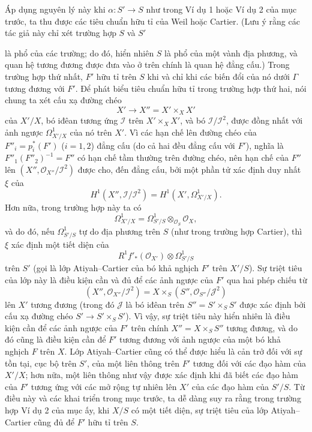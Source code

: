 Áp dụng nguyên lý này khi $\alpha:S'\longrightarrow S$ như trong Ví dụ 1 hoặc
Ví dụ 2 của mục trước, ta thu được các tiêu chuẩn hữu tỉ của Weil hoặc Cartier.
(Lưu ý rằng các tác giả này chỉ xét trường hợp $S$ và $S'$

là phổ của các trường; do đó, hiển nhiên $S$ là phổ của một vành địa phương,
và quan hệ tương đương được đưa vào ở trên chính là quan hệ đẳng cấu.) Trong
trường hợp thứ nhất, $F'$ hữu tỉ trên $S$ khi và chỉ khi các biến đổi của nó
dưới $\Gamma$ tương đương với $F'$. Để phát biểu tiêu chuẩn hữu tỉ trong trường
hợp thứ hai, nói chung ta xét cấu xạ đường chéo
\[
  X'\longrightarrow X''=X'\times_XX'
\]
của $X'/X$, bó iđêan tương ứng $\mathcal I$ trên $X'\times_XX'$, và bó
$\mathcal I/\mathcal I^2$, được đồng nhất với ảnh ngược
$\Omega^1_{X'/X}$ của nó trên $X'$. Vì các hạn chế lên đường chéo của
$F''_i=p_i^*(F')$ ($i=1,2$) đẳng cấu (do cả hai đều đẳng cấu với $F'$), nghĩa
là $F''_1(F''_2)^{-1}=F''$ có hạn chế tầm thường trên đường chéo, nên hạn chế
của $F''$ lên $(X'',\mathcal O_{X''}/\mathcal I^2)$ được cho, đến đẳng cấu,
bởi một phần tử xác định duy nhất $\xi$ của
\[
  H^1(X'',\mathcal I/\mathcal I^2)
  =H^1(X',\Omega^1_{X'/X}).
\]
Hơn nữa, trong trường hợp này ta có
\[
  \Omega^1_{X'/X}
  =\Omega^1_{S'/S}\otimes_{\mathcal O_S}\mathcal O_X,
\]
và do đó, nếu $\Omega^1_{S'/S}$ tự do địa phương trên $S$ (như trong trường
hợp Cartier), thì $\xi$ xác định một tiết diện của
\[
  R^1f'_*(\mathcal O_{X'})\otimes\Omega^1_{S'/S}
\]
trên $S'$ (gọi là lớp Atiyah--Cartier của bó khả nghịch $F'$ trên $X'/S$).
Sự triệt tiêu của lớp này là điều kiện cần và đủ để các ảnh ngược của $F'$ qua
hai phép chiếu từ
\[
  (X'',\mathcal O_{X''}/\mathcal I^2)
  =X\times_S(S'',\mathcal O_{S''}/\mathcal J^2)
\]
lên $X'$ tương đương (trong đó $\mathcal J$ là bó iđêan trên
$S''=S'\times_SS'$ được xác định bởi cấu xạ đường chéo
$S'\longrightarrow S'\times_SS'$). Vì vậy, sự triệt tiêu này hiển nhiên là
điều kiện cần để các ảnh ngược của $F'$ trên chính
$X''=X\times_SS''$ tương đương, và do đó cũng là điều kiện cần để $F'$ tương
đương với ảnh ngược của một bó khả nghịch $F$ trên $X$. Lớp Atiyah--Cartier
cũng có thể được hiểu là cản trở đối với sự tồn tại, cục bộ trên $S'$, của một
liên thông trên $F'$ tương đối với các đạo hàm của $X'/X$; hơn nữa, một liên
thông như vậy được xác định khi đã biết các đạo hàm của $F'$ tương ứng với các
mở rộng tự nhiên lên $X'$ của các đạo hàm của $S'/S$. Từ điều này và các khai
triển trong mục trước, ta dễ dàng suy ra rằng trong trường hợp Ví dụ 2 của mục
ấy, khi $X/S$ có một tiết diện, sự triệt tiêu của lớp Atiyah--Cartier cũng đủ
để $F'$ hữu tỉ trên $S$.

